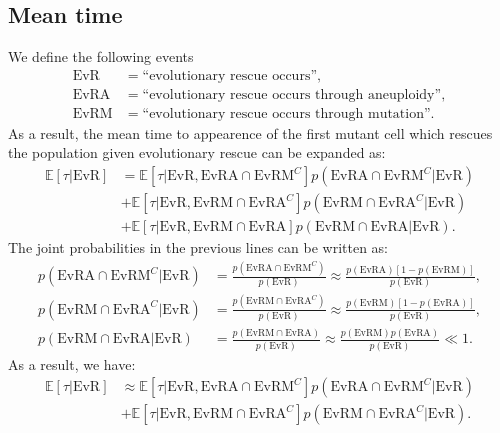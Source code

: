 \documentclass[12pt]{extarticle}
\begin{document}
\begin{appendices}
\section*{Mean time}
We define the following events
\begin{align*}
\text{EvR}&=\text{``evolutionary rescue occurs''},\\
\text{EvRA}&=\text{``evolutionary rescue occurs through aneuploidy''},\\
\text{EvRM}&=\text{``evolutionary rescue occurs through mutation''}.
\end{align*}
As a result, the mean time to appearence of the first mutant cell which rescues the population given evolutionary rescue can be expanded as:
\begin{align*}
\mathbb{E}\left[\tau|\text{EvR}\right]&=\mathbb{E}\left[\tau|\text{EvR},\text{EvRA}\cap\text{EvRM}^{C}\right]p\left(\text{EvRA}\cap\text{EvRM}^{C}|\text{EvR}\right)\\
&+\mathbb{E}\left[\tau|\text{EvR},\text{EvRM}\cap\text{EvRA}^{C}\right]p\left(\text{EvRM}\cap\text{EvRA}^{C}|\text{EvR}\right)\\
&+\mathbb{E}\left[\tau|\text{EvR},\text{EvRM}\cap\text{EvRA}\right]p\left(\text{EvRM}\cap\text{EvRA}|\text{EvR}\right).
\end{align*}
The joint probabilities in the previous lines can be written as:
\begin{align*}
p\left(\text{EvRA}\cap\text{EvRM}^{C}|\text{EvR}\right)&=\frac{p\left(\text{EvRA}\cap\text{EvRM}^{C}\right)}{p\left(\text{EvR}\right)}
\approx\frac{p\left(\text{EvRA}\right)\left[1-p\left(\text{EvRM}\right)\right]}{p\left(\text{EvR}\right)},\\
p\left(\text{EvRM}\cap\text{EvRA}^{C}|\text{EvR}\right)&=\frac{p\left(\text{EvRM}\cap\text{EvRA}^{C}\right)}{p\left(\text{EvR}\right)}
\approx\frac{p\left(\text{EvRM}\right)\left[1-p\left(\text{EvRA}\right)\right]}{p\left(\text{EvR}\right)},\\
p\left(\text{EvRM}\cap\text{EvRA}|\text{EvR}\right)&=\frac{p\left(\text{EvRM}\cap\text{EvRA}\right)}{p\left(\text{EvR}\right)}\approx\frac{p\left(\text{EvRM}\right)p\left(\text{EvRA}\right)}{p\left(\text{EvR}\right)}\ll1.
\end{align*}
As a result, we have:
\begin{align*}
\mathbb{E}\left[\tau|\text{EvR}\right]&\approx\mathbb{E}\left[\tau|\text{EvR},\text{EvRA}\cap\text{EvRM}^{C}\right]p\left(\text{EvRA}\cap\text{EvRM}^{C}|\text{EvR}\right)\\
&+\mathbb{E}\left[\tau|\text{EvR},\text{EvRM}\cap\text{EvRA}^{C}\right]p\left(\text{EvRM}\cap\text{EvRA}^{C}|\text{EvR}\right).
\end{align*}

\end{appendices}
\end{document}
